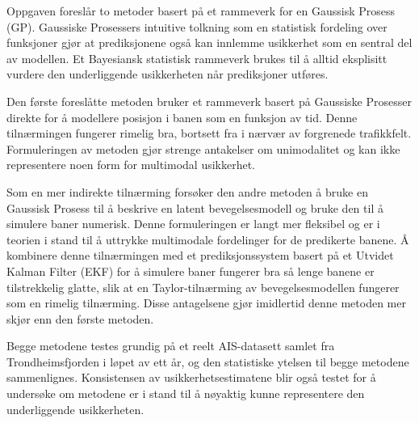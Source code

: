 Oppgaven foreslår to metoder basert på et rammeverk for en Gaussisk Prosess (GP). Gaussiske Prosessers intuitive tolkning som en statistisk fordeling over funksjoner gjør at prediksjonene også kan innlemme usikkerhet som en sentral del av modellen. Et Bayesiansk statistisk rammeverk brukes til å alltid eksplisitt vurdere den underliggende usikkerheten når prediksjoner utføres.

Den første foreslåtte metoden bruker et rammeverk basert på Gaussiske Prosesser direkte for å modellere posisjon i banen som en funksjon av tid. Denne tilnærmingen fungerer rimelig bra, bortsett fra i nærvær av forgrenede trafikkfelt. Formuleringen av metoden gjør strenge antakelser om unimodalitet og kan ikke representere noen form for multimodal usikkerhet.

Som en mer indirekte tilnærming forsøker den andre metoden å bruke en Gaussisk Prosess til å beskrive en latent bevegelsesmodell og bruke den til å simulere baner numerisk. Denne formuleringen er langt mer fleksibel og er i teorien i stand til å uttrykke multimodale fordelinger for de predikerte banene. Å kombinere denne tilnærmingen med et prediksjonssystem basert på et Utvidet Kalman Filter (EKF) for å simulere baner fungerer bra så lenge banene er tilstrekkelig glatte, slik at en Taylor-tilnærming av bevegelsesmodellen fungerer som en rimelig tilnærming. Disse antagelsene gjør imidlertid denne metoden mer skjør enn den første metoden.

Begge metodene testes grundig på et reelt AIS-datasett samlet fra Trondheimsfjorden i løpet av ett år, og den statistiske ytelsen til begge metodene sammenlignes. Konsistensen av usikkerhetsestimatene blir også testet for å undersøke om metodene er i stand til å nøyaktig kunne representere den underliggende usikkerheten.





